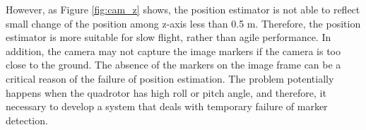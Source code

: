 However, as Figure \ref{fig:cam_z} shows, the position estimator is not able to reflect small change of the position among z-axis less than 0.5 m. Therefore, the position estimator is more suitable for slow flight, rather than agile performance. In addition, the camera may not capture the image markers if the camera is too close to the ground. The absence of the markers on the image frame can be a critical reason of the failure of position estimation. The problem potentially happens when the quadrotor has high roll or pitch angle, and therefore, it necessary to develop a system that deals with temporary failure of marker detection. 